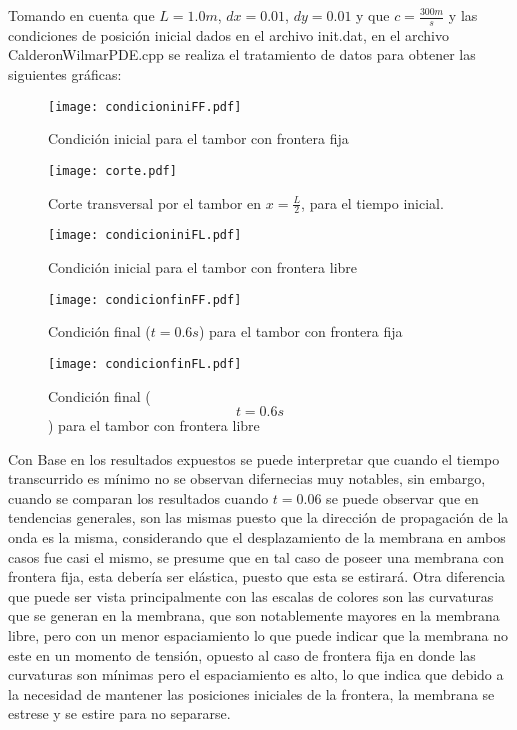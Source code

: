 \documentclass[11pt,letterpaper]{exam}
\begin{document}
Tomando en cuenta que $L=1.0m$, $dx=0.01$, $dy=0.01$ y que $c=\frac{300m}{s}$ y las condiciones de posici\'on inicial dados en el archivo init.dat, en el archivo CalderonWilmarPDE.cpp se realiza el tratamiento de datos para obtener las siguientes gr\'aficas:   

\begin{figure}[H]
\begin{center}
\texttt{[image: condicioniniFF.pdf]} 
\caption{\label{fig:typical}Condici\'on inicial para el tambor con frontera fija}
\end{center}
\end{figure}


\begin{figure}[H]
\begin{center}
\texttt{[image: corte.pdf]} 
\caption{\label{fig:typical}Corte transversal por el tambor en $x=\frac{L}{2}$, para el tiempo inicial.}
\end{center}
\end{figure}

\begin{figure}[H]
\begin{center}
\texttt{[image: condicioniniFL.pdf]} 
\caption{\label{fig:typical}Condici\'on inicial para el tambor con frontera libre}
\end{center}
\end{figure}


\begin{figure}[H]
\begin{center}
\texttt{[image: condicionfinFF.pdf]} 
\caption{\label{fig:typical}Condici\'on final ($t=0.6 s$) para el tambor con frontera fija}
\end{center}
\end{figure}


\begin{figure}[H]
\begin{center}
\texttt{[image: condicionfinFL.pdf]} 
\caption{\label{fig:typical}Condici\'on final ($$t=0.6 s$$) para el tambor con frontera libre}
\end{center}
\end{figure}
Con Base en los resultados expuestos se puede interpretar que cuando el tiempo transcurrido es m\'inimo no se observan difernecias muy notables, sin embargo, cuando se comparan los resultados cuando $t=0.06$ se puede observar que en tendencias generales, son las mismas puesto que la direcci\'on de propagaci\'on de la onda es la misma, considerando que el desplazamiento de la membrana en ambos casos fue casi el mismo, se presume que en tal caso de poseer una membrana con frontera fija, esta deber\'ia ser el\'astica, puesto que esta se estirar\'a. Otra diferencia que puede ser vista principalmente con las escalas de colores son las curvaturas que se generan en la membrana, que son notablemente mayores en la membrana libre, pero con un menor espaciamiento lo que puede indicar que la membrana no este en un momento de tensi\'on, opuesto al caso de frontera fija en donde las curvaturas son m\'inimas pero el espaciamiento es alto, lo que indica que debido a la necesidad de mantener las posiciones iniciales de la frontera, la membrana se estrese y se estire para no separarse.
\end{document}
